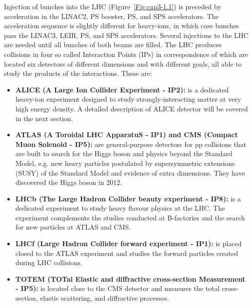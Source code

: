 Injection of bunches into the LHC (\mbox{Figure \ref{Fig:cap3-1.1}}) is preceded by acceleration in the LINAC2, PS booster, PS, and SPS accelerators. The acceleration sequence is slightly different for heavy-ions, in which case bunches pass the LINAC3, LEIR, PS, and SPS accelerators. Several injections to the LHC are needed until all bunches of both beams are filled. The LHC produces collisions in four so called Interaction Points (IPs) in correspondence of which are located six detectors of different dimensions and with different goals, all able to study the products of the interactions. These are: 
\begin{itemize}
\item \textbf{ALICE (A Large Ion Collider Experiment - IP2):} is a dedicated heavy-ion experiment designed to study strongly-interacting matter at very high energy density. A detailed description of ALICE detector will be covered in the next section.

\item \textbf{ATLAS (A Toroidal LHC ApparatuS - IP1) and CMS (Compact Muon Solenoid - IP5):} are general-purpose detectors for pp collisions that are built to search for the Higgs boson and physics beyond the Standard Model, e.g. new heavy particles postulated by supersymmetric extensions (SUSY) of the Standard Model and evidence of extra dimensions. They have discovered the Higgs boson in 2012. 

\item \textbf{LHCb (The Large Hadron Collider beauty experiment - IP8):} is a dedicated experiment to study heavy flavour physics at the LHC. The experiment complements the studies conducted at B-factories and the search for new particles at ATLAS and CMS. 
\item \textbf{LHCf (Large Hadron Collider forward experiment - IP1):} is placed closed to the ATLAS experiment and studies the forward particles created during LHC collisions.

\item \textbf{TOTEM (TOTal Elastic and diffractive cross-section Measurement - IP5):} is located close to the CMS detector and measures the total cross-section, elastic scattering, and diffractive processes.

\end{itemize}


